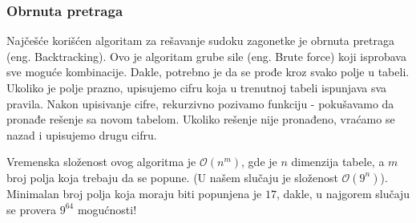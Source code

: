 \documentclass[a4paper]{article}
\begin{document}
    \subsubsection{Obrnuta pretraga}
    Najčešće korišćen algoritam za rešavanje sudoku zagonetke je obrnuta pretraga (eng. Backtracking).
    Ovo je algoritam grube sile (eng. Brute force) koji isprobava sve moguće kombinacije. Dakle, potrebno je da se prođe kroz
    svako polje u tabeli. Ukoliko je polje prazno, upisujemo cifru koja u trenutnoj tabeli ispunjava sva pravila. Nakon upisivanje cifre, rekurzivno pozivamo funkciju 
    - pokušavamo da pronađe rešenje sa novom tabelom. Ukoliko rešenje nije pronađeno, vraćamo se nazad i upisujemo drugu cifru. 
    \par Vremenska složenost ovog algoritma je $\mathcal{O}(n ^ m)$, gde je $n$ dimenzija tabele, a $m$ broj polja koja trebaju da se popune.
    (U našem slučaju je složenost $\mathcal{O}(9^n)$). Minimalan broj polja koja
    moraju biti popunjena je $17$, dakle, u najgorem slučaju se provera $9^{64}$ mogućnosti!
    
\end{document}
